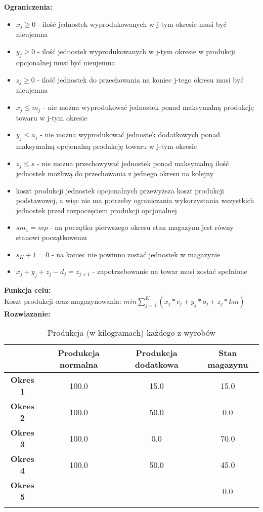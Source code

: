 \documentclass[15pt, a4paper]{article}
\begin{document}
\noindent\textbf{Ograniczenia:}

\begin{itemize}
    \item \(x_{j} \geq 0 \) - ilość jednostek wyprodukowanych w j-tym okresie musi być nieujemna
    \item \(y_{j} \geq 0 \) - ilość jednostek wyprodukowanych w j-tym okresie w produkcji opcjonalnej musi być nieujemna
    \item \(z_{j} \geq 0 \) - ilość jednostek do przechowania na koniec j-tego okresu musi być nieujemna
    \item \( x_{j} \leq m_j \) - nie można wyprodukować jednostek ponad maksymalną produkcję towaru w j-tym okresie     
    \item \( y_{j} \leq a_j\) - nie można wyprodukować jednostek dodatkowych ponad maksymalną opcjonalną produkcję towaru w j-tym okresie     
    \item \( z_j \leq s \) - nie można przechowywać jednostek ponad maksymalną ilość jednostek możliwą do przechowania z jednego okresu na kolejny
    \item koszt produkcji jednostek opcjonalnych przewyższa koszt produkcji podstawowej, a więc nie ma potrzeby ograniczania wykorzystania wszystkich jednostek przed rozpoczęciem produkcji opcjonalnej
    \item \( sm_1 = mp \) - na początku pierwszego okresu stan magazynu jest równy stanowi początkowemu 
    \item \( s_K+1 = 0 \) - na koniec nie powinno zostać jednostek w magazynie
    \item \( x_j + y_j + z_j - d_j = z_{j+1} \) - zapotrzebowanie na towar musi zostać spełnione
\end{itemize}

\noindent\textbf{Funkcja celu:}\\

Koszt produkcji oraz magazynowania: \(min \sum_{j=1}^{K}(x_{j} * c_{j} + y_{j} * o_{j} + z_{j} * km)\)\\

\noindent\textbf{Rozwiazanie:}\\ 

\begin{longtable}{|c|c|c|c|}
    \hline
    & \textbf{Produkcja normalna} & \textbf{Produkcja dodatkowa} & \textbf{Stan magazynu} \\ 
    \hline
    \textbf{Okres 1} & 100.0 & 15.0 & 15.0 \\ 
    \hline
    \textbf{Okres 2} & 100.0 & 50.0 & 0.0 \\ 
    \hline
    \textbf{Okres 3} & 100.0 & 0.0 & 70.0 \\ 
    \hline
    \textbf{Okres 4} & 100.0 & 50.0 & 45.0 \\ 
    \hline
    \textbf{Okres 5} & & & 0.0 \\ 
    \hline
\caption{Produkcja (w kilogramach) każdego z wyrobów}
\end{longtable}
\end{document}
